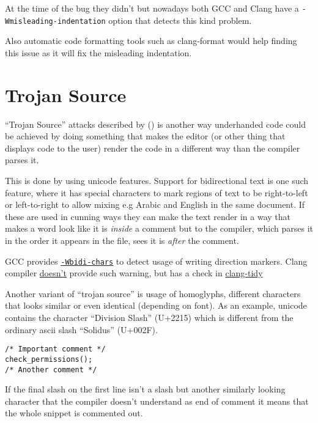 \documentclass[
  a4paper,
]{report}
\begin{document}
At the time of the bug they didn't but nowadays both GCC and Clang have
a \texttt{-Wmisleading-indentation} option that detects this kind
problem.

Also automatic code formatting tools such as clang-format would help
finding this issue as it will fix the misleading indentation.

\section{Trojan Source}\label{trojan-source}

``Trojan Source'' attacks described by
() is another way
underhanded code could be achieved by doing something that makes the
editor (or other thing that displays code to the user) render the code
in a different way than the compiler parses it.

This is done by using unicode features. Support for bidirectional text
is one such feature, where it has special characters to mark regions of
text to be right-to-left or left-to-right to allow mixing e.g Arabic and
English in the same document. If these are used in cunning ways they can
make the text render in a way that makes a word look like it is
\emph{inside} a comment but to the compiler, which parses it in the
order it appears in the file, sees it is \emph{after} the comment.

GCC provides
\href{https://gcc.gnu.org/onlinedocs/gcc/Warning-Options.html\#index-Wbidi-chars_003d}{\texttt{-Wbidi-chars}}
to detect usage of writing direction markers. Clang compiler
\href{https://bugs.chromium.org/p/llvm/issues/detail?id=11\#c9}{doesn't}
provide such warning, but has a check in
\href{https://clang.llvm.org/extra/clang-tidy/checks/misc/misleading-bidirectional.html}{clang-tidy}

Another variant of ``trojan source'' is usage of homoglyphs, different
characters that looks similar or even identical (depending on font). As
an example, unicode contains the character ``Division Slash'' (U+2215)
which is different from the ordinary ascii slash ``Solidus'' (U+002F).

\begin{verbatim}
/* Important comment */
check_permissions();
/* Another comment */
\end{verbatim}

If the final slash on the first line isn't a slash but another similarly
looking character that the compiler doesn't understand as end of comment
it means that the whole snippet is commented out.
\end{document}
